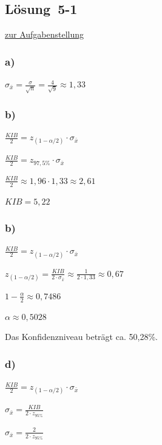 \documentclass[
  11pt,
  ngerman,
  a4paper,
]{report}
\begin{document}
\hypertarget{loesung-5-1}{%
\subsection{Lösung~5-1}\label{loesung-5-1}}

\protect\hyperlink{aufgabe-5-1}{zur Aufgabenstellung}

\hypertarget{a-15}{%
\subsubsection{a)}\label{a-15}}

\(\sigma _{\bar{x}}=\frac{\sigma}{\sqrt{n}}=\frac{4}{\sqrt{9}}\approx1{,}33\)

\hypertarget{b-15}{%
\subsubsection{b)}\label{b-15}}

\(\frac{\mathit{KIB}}{2}=z_{(1-\alpha/2)} \cdot \sigma_{\bar{x}}\)

\(\frac{\mathit{KIB}}{2}= z_{97{,}5\%}\cdot \sigma_{\bar{x}}\)

\(\frac{\mathit{KIB}}{2}\approx 1{,}96 \cdot 1{,}33 \approx 2{,}61\)

\(\mathit{KIB}=5{,}22\)

\hypertarget{b-16}{%
\subsubsection{b)}\label{b-16}}

\(\frac{\mathit{KIB}}{2}=z_{(1-\alpha/2)} \cdot \sigma_{\bar{x}}\)

\(z_{(1-\alpha/2)} = \frac{\mathit{KIB}}{2 \cdot \sigma_{\bar{x}}}\approx\frac{1}{2 \cdot 1{,}33}\approx0{,}67\)

\(1-\frac{\alpha}{2} \approx 0,7486\)

\(\alpha \approx 0,5028\)

Das Konfidenzniveau beträgt ca. 50,28\%.

\hypertarget{d-6}{%
\subsubsection{d)}\label{d-6}}

\(\frac{\mathit{KIB}}{2} = z_{(1-\alpha/2)} \cdot \sigma_{\bar{x}}\)

\(\sigma_{\bar{x}} = \frac{\mathit{KIB}}{2\cdot z_{95\%}}\)

\(\sigma_{\bar{x}} = \frac{2}{2 \cdot z_{95\%}}\)
\end{document}
